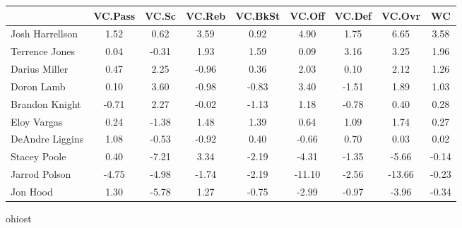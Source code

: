 \documentclass[10pt,letterpaper]{article}
\begin{document}
\begin{table}[ht]
\begin{center}
\begin{tabular}{lcccccccc}
  \hline
 & VC.Pass & VC.Sc & VC.Reb & VC.BkSt & VC.Off & VC.Def & VC.Ovr & WC \\ 
  \hline
Josh Harrellson & 1.52 & 0.62 & 3.59 & 0.92 & 4.90 & 1.75 & 6.65 & 3.58 \\ 
  Terrence Jones & 0.04 & -0.31 & 1.93 & 1.59 & 0.09 & 3.16 & 3.25 & 1.96 \\ 
  Darius Miller & 0.47 & 2.25 & -0.96 & 0.36 & 2.03 & 0.10 & 2.12 & 1.26 \\ 
  Doron Lamb & 0.10 & 3.60 & -0.98 & -0.83 & 3.40 & -1.51 & 1.89 & 1.03 \\ 
  Brandon Knight & -0.71 & 2.27 & -0.02 & -1.13 & 1.18 & -0.78 & 0.40 & 0.28 \\ 
  Eloy Vargas & 0.24 & -1.38 & 1.48 & 1.39 & 0.64 & 1.09 & 1.74 & 0.27 \\ 
  DeAndre Liggins & 1.08 & -0.53 & -0.92 & 0.40 & -0.66 & 0.70 & 0.03 & 0.02 \\ 
  Stacey Poole & 0.40 & -7.21 & 3.34 & -2.19 & -4.31 & -1.35 & -5.66 & -0.14 \\ 
  Jarrod Polson & -4.75 & -4.98 & -1.74 & -2.19 & -11.10 & -2.56 & -13.66 & -0.23 \\ 
  Jon Hood & 1.30 & -5.78 & 1.27 & -0.75 & -2.99 & -0.97 & -3.96 & -0.34 \\ 
   \hline
\end{tabular}
\end{center}
\end{table}
\newpage
\begin{center}
ohiost 
\end{center}
\end{document}
